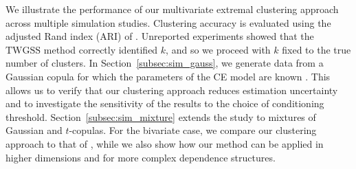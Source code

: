 \documentclass[12pt,compact]{article}
\begin{document}
We illustrate the performance of our multivariate extremal clustering approach across multiple simulation studies. 
Clustering accuracy is evaluated using the adjusted Rand index (ARI) of \citet{Hubert1985-ys}. %
Unreported experiments showed that the $\mathrm{TWGSS}$ method correctly identified $k$, and so we proceed with $k$ fixed to the true number of clusters.
In Section~\ref{subsec:sim_gauss}, we generate data from a Gaussian copula for which the parameters of the CE model are known \citep{Keef2013}.
This allows us to verify that our clustering approach reduces estimation uncertainty and to investigate the sensitivity of the results to the choice of conditioning threshold.
Section~\ref{subsec:sim_mixture} extends the study to mixtures of Gaussian and $t$-copulas.
For the bivariate case, we compare our clustering approach to that of \citet{Vignotto2021}, while we also show how our method can be applied in higher dimensions and for more complex dependence structures.
\end{document}
